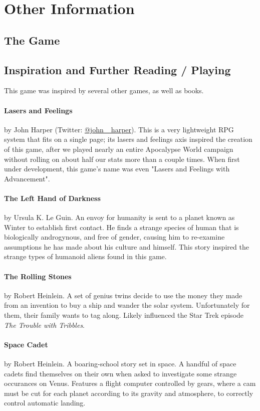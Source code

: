 \section{Other Information}

\subsection{The Game}

\subsection{Inspiration and Further Reading / Playing}
\par
This game was inspired by several other games, as well as books.

\paragraph{Lasers and Feelings}
by John Harper (Twitter: \href{https://twitter.com/john_harper/}{@john\_ harper}). This is a very lightweight RPG system that fits on a single page; its lasers and feelings axis inspired the creation of this game, after we played nearly an entire Apocalypse World campaign without rolling on about half our stats more than a couple times. When first under development, this game's name was even "Lasers and Feelings with Advancement".

\paragraph{The Left Hand of Darkness}
by Ursula K. Le Guin. An envoy for humanity is sent to a planet known as Winter to establish first contact. He finds a strange species of human that is biologically androgynous, and free of gender, causing him to re-examine assumptions he has made about his culture and himself. This story inspired the strange types of humanoid aliens found in this game.

\paragraph{The Rolling Stones}
by Robert Heinlein. A set of genius twins decide to use the money they made from an invention to buy a ship and wander the solar system. Unfortunately for them, their family wants to tag along. Likely influenced the Star Trek episode \textit{The Trouble with Tribbles}.

\paragraph{Space Cadet}
by Robert Heinlein. A boaring-school story set in space. A handful of space cadets find themselves on their own when asked to investigate some strange occurances on Venus. Features a flight computer controlled by gears, where a cam must be cut for each planet according to its gravity and atmosphere, to correctly control automatic landing.


